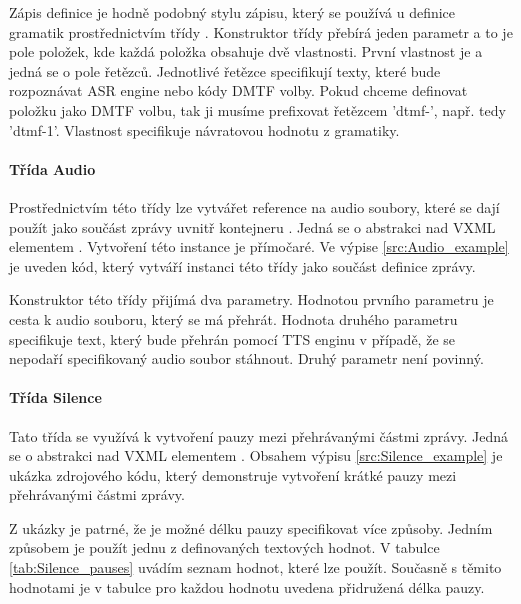 \documentclass[ing,male,java,dept460]{diploma}						%
\begin{document}


Zápis definice je hodně podobný stylu zápisu, který se používá u definice gramatik prostřednictvím třídy . Konstruktor třídy  přebírá jeden parametr a to je pole položek, kde každá položka obsahuje dvě vlastnosti. První vlastnost je  a jedná se o pole řetězců. Jednotlivé řetězce specifikují texty, které bude rozpoznávat ASR engine nebo kódy DMTF volby. Pokud chceme definovat položku jako DMTF volbu, tak ji musíme prefixovat řetězcem 'dtmf-', např. tedy 'dtmf-1'. Vlastnost  specifikuje návratovou hodnotu z gramatiky.

\paragraph{Třída Audio}
\label{sec:Audio}
Prostřednictvím této třídy lze vytvářet reference na audio soubory, které se dají použít jako součást zprávy uvnitř kontejneru . Jedná se o abstrakci nad VXML elementem . Vytvoření této instance je přímočaré. Ve výpise \ref{src:Audio_example} je uveden kód, který vytváří instanci této třídy jako součást definice zprávy.



Konstruktor této třídy přijímá dva parametry. Hodnotou prvního parametru je cesta k audio souboru, který se má přehrát. Hodnota druhého parametru specifikuje text, který bude přehrán pomocí TTS enginu v případě, že se nepodaří specifikovaný audio soubor stáhnout. Druhý parametr není povinný.

\paragraph{Třída Silence}
\label{sec:Silence}
Tato třída se využívá k vytvoření pauzy mezi přehrávanými částmi zprávy. Jedná se o abstrakci nad VXML elementem . Obsahem výpisu \ref{src:Silence_example} je ukázka zdrojového kódu, který demonstruje vytvoření krátké pauzy mezi přehrávanými částmi zprávy.

Z ukázky je patrné, že je možné délku pauzy specifikovat více způsoby. Jedním způsobem je použít jednu z definovaných textových hodnot. V tabulce \ref{tab:Silence_pauses} uvádím seznam hodnot, které lze použít. Současně s těmito hodnotami je v tabulce pro každou hodnotu uvedena přidružená délka pauzy\cite{vxml_org}.
\end{document}
